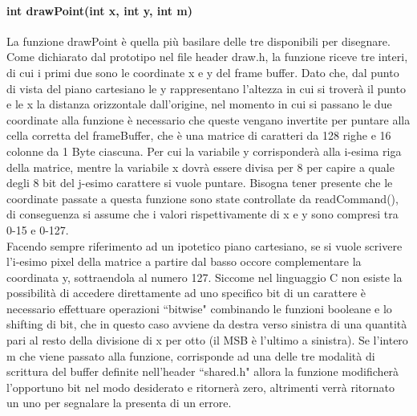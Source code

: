 \documentclass{article}
\begin{document}
		\paragraph{int drawPoint(int x, int y, int m)} La funzione drawPoint è quella più basilare delle tre disponibili per disegnare. Come dichiarato dal prototipo nel file header draw.h, la funzione riceve tre interi, di cui i primi due sono le coordinate x e y del frame buffer. Dato che, dal punto di vista del piano cartesiano le y rappresentano l'altezza in cui si troverà il punto e le x la distanza orizzontale dall'origine, nel momento in cui si passano le due coordinate alla funzione è necessario che queste vengano invertite per puntare alla cella corretta del frameBuffer, che è una matrice di caratteri da 128 righe e 16 colonne da 1 Byte ciascuna. Per cui la variabile y corrisponderà alla i-esima riga della matrice, mentre la variabile x dovrà essere divisa per 8 per capire a quale degli 8 bit del j-esimo carattere si vuole puntare. Bisogna tener presente che le coordinate passate a questa funzione sono state controllate da readCommand(), di conseguenza si assume che i valori rispettivamente di x e y sono compresi tra 0-15 e 0-127.\\
		Facendo sempre riferimento ad un ipotetico piano cartesiano, se si vuole scrivere l'i-esimo pixel della matrice a partire dal basso occore complementare la coordinata y, sottraendola al numero 127. Siccome nel linguaggio C non esiste la possibilità di accedere direttamente ad uno specifico bit di un carattere è necessario effettuare operazioni ``bitwise" combinando le funzioni booleane e lo shifting di bit, che in questo caso avviene da destra verso sinistra di una quantità pari al resto della divisione di x per otto (il MSB è l'ultimo a sinistra).
		\newline
		Se l'intero m che viene passato alla funzione, corrisponde ad una delle tre modalità di scrittura del buffer definite nell'header ``shared.h" allora la funzione modificherà l'opportuno bit nel modo desiderato e ritornerà zero, altrimenti verrà ritornato un uno per segnalare la presenta di un errore. 
\end{document}
